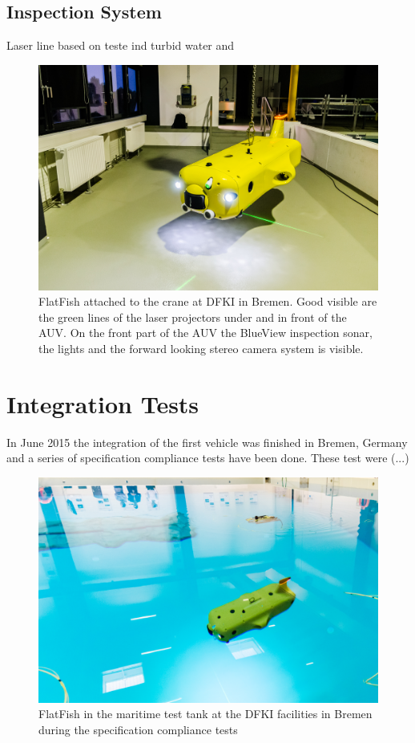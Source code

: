 \documentclass[conference]{IEEEtran}
\begin{document}
\subsection{Inspection System}

Laser line based on \cite{duda2013} teste ind turbid water \cite{albiez2015} and \cite{mcleod2013}

\begin{figure}[!t]
	\centering
	\includegraphics[width=0.9\columnwidth]{FlatFish-3.jpg}
	\caption{FlatFish attached to the crane at DFKI in Bremen. Good visible are the green lines of the laser projectors under and in front of the AUV. On the front part of the AUV the BlueView inspection sonar, the lights and the forward looking stereo camera system is visible.}
	\label{fig:flatfishlaser}
\end{figure}


\section{Integration Tests}

In June 2015 the integration of the first vehicle was finished in Bremen, Germany and a series of specification compliance tests have been done. These test were (...)

\begin{figure}[!t]
	\centering
	\includegraphics[width=0.9\columnwidth]{FlatFish-2.jpg}
	\caption{FlatFish in the maritime test tank at the DFKI facilities in Bremen during the specification compliance tests}
	\label{fig:flatfish2}
\end{figure}
\end{document}
